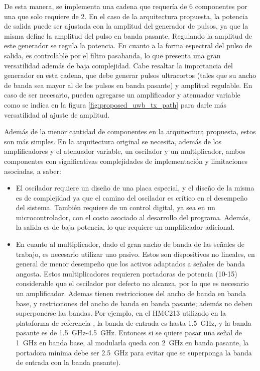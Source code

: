 De esta manera, se implementa una cadena que requería de 6 componentes por una
que solo requiere de 2. En el caso de la arquitectura propuesta, la potencia de
salida puede ser ajustada con la amplitud del generador de pulsos, ya que la
misma define la amplitud del pulso en banda pasante. Regulando la amplitud de
este generador se regula la potencia. En cuanto a la forma espectral del pulso
de salida, es controlable por el filtro pasabanda, lo que presenta una gran
versatilidad además de baja complejidad.  Cabe resaltar la importancia del
generador en esta cadena, que debe generar pulsos ultracortos (tales que su
ancho de banda sea mayor al de los pulsos en banda pasante) y amplitud
regulable. En caso de ser necesario, pueden agregarse un amplificador y
atenuador variable como se indica en la figura \ref{fig:proposed_uwb_tx_path}
para darle más versatilidad al ajuste de amplitud.

Además de la menor cantidad de componentes en la arquitectura propuesta, estos
son más simples. En la arquitectura original se necesita, además de los
amplificadores y el atenuador variable, un oscilador y un multiplicador, ambos
componentes con significativas complejidades de implementación y limitaciones
asociadas, a saber:

\begin{itemize}
    \item El oscilador requiere un diseño de una placa especial, y el diseño de
        la misma es de complejidad ya que el camino del  oscilador es crítico en
        el desempeño del sistema. También requiere de un control digital, ya sea
        en un microcontrolador, con el costo asociado al desarrollo del
        programa. Además, la salida es de baja potencia, lo que requiere un
        amplificador adicional.
    \item En cuanto al multiplicador, dado el gran ancho de banda de las señales
        de trabajo, es necesario utilizar uno pasivo. Estos son dispositivos no
        lineales, en general de menor desempeño que los activos adaptados a
        señales de banda angosta.  Estos multiplicadores requieren portadoras de
        potencia (\qty{10}{\dBm}-\qty{15}{\dBm}) considerable que el oscilador
        por defecto no alcanza, por lo que es necesario un amplificador. Ademas
        tienen restricciones del ancho de banda en banda base, y restricciones
        del ancho de banda en banda pasante; además no deben superponerse las
        bandas. Por ejemplo, en el HMC213 utilizado en la plataforma de
        referencia \cite{Altieri2021}, la banda de entrada es hasta
        \qty{1.5}{\giga\hertz}, y la banda pasante es de
        \qty{1.5}{\giga\hertz}-\qty{4.5}{\giga\hertz}. Entonces si se quiere
        pasar una señal de \qty{1}{\giga\hertz} en banda base, al modularla
        queda con \qty{2}{\giga\hertz} en banda pasante, la portadora mínima
        debe ser \qty{2.5}{\giga\hertz} para evitar que se superponga la banda
        de entrada con la banda pasante).
\end{itemize}

